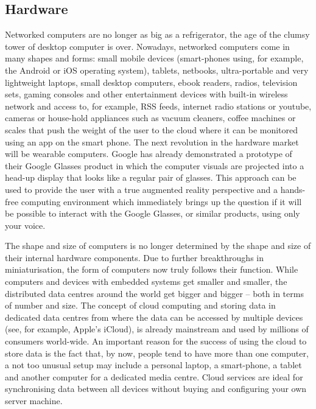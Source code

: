 \documentclass[10pt, plain]{../../metanetpaper}
\begin{document}
\begin{multicols}{2}

\subsection{Hardware}
\label{sec:hardware}

Networked computers are no longer as big as a refrigerator, the age of the clumsy tower of desktop computer is over. Nowadays, networked computers come in many shapes and forms: small mobile devices (smart-phones using, for example, the Android or iOS operating system), tablets, netbooks, ultra-portable and very lightweight laptops, small desktop computers, ebook readers, radios, television sets, gaming consoles and other entertainment devices with built-in wireless network and access to, for example, RSS feeds, internet radio stations or youtube, cameras or house-hold appliances such as vacuum cleaners, coffee machines or scales that push the weight of the user to the cloud where it can be monitored using an app on the smart phone. The next revolution in the hardware market will be wearable computers. Google has already demonstrated a prototype of their Google Glasses product in which the computer visuals are projected into a head-up display that looks like a regular pair of glasses. This approach can be used to provide the user with a true augmented reality perspective and a hands-free computing environment which immediately brings up the question if it will be possible to interact with the Google Glasses, or similar products, using only your voice.

The shape and size of computers is no longer determined by the shape and size of their internal hardware components. Due to further breakthroughs in miniaturisation, the form of computers now truly follows their function. While computers and devices with embedded systems get smaller and smaller, the distributed data centres around the world get bigger and bigger -- both in terms of number and size. The concept of cloud computing and storing data in dedicated data centres from where the data can be accessed by multiple devices (see, for example, Apple's iCloud), is already mainstream and used by millions of consumers world-wide. An important reason for the success of using the cloud to store data is the fact that, by now, people tend to have more than one computer, a not too unusual setup may include a personal laptop, a smart-phone, a tablet and another computer for a dedicated media centre. Cloud services are ideal for synchronising data between all devices without buying and configuring your own server machine.


\end{multicols}
\end{document}

